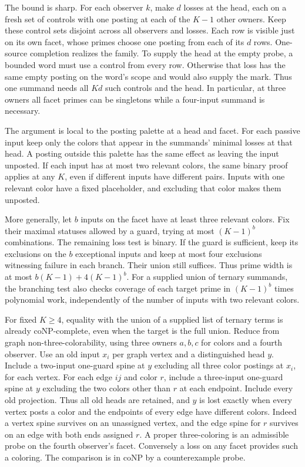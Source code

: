 The bound is sharp. For each observer $k$,
make $d$ losses at the head, each on a fresh
set of controls with one posting at each of the
$K-1$ other owners. Keep these control sets
disjoint across all observers and losses.
Each row is visible just on its own facet,
whose primes choose one posting from each of
its $d$ rows. One-source completion realizes
the family. To supply the head at the empty
probe, a bounded word must use a control
from every row. Otherwise that loss has the
same empty posting on the word's scope and
would also supply the mark. Thus one
summand needs all $Kd$ such controls and
the head. In particular, at three owners
all facet primes can be singletons while
a four-input summand is necessary.

The argument is local to the posting palette
at a head and facet. For each passive input
keep only the colors that appear in the
summands' minimal losses at that head.
A posting outside this palette has the same
effect as leaving the input unposted. If
each input has at most two relevant colors,
the same binary proof applies at any $K$,
even if different inputs have different
pairs. Inputs with one relevant color have
a fixed placeholder, and excluding that
color makes them unposted.

More generally, let $b$ inputs on the facet
have at least three relevant colors. Fix
their maximal statuses allowed by a guard,
trying at most $(K-1)^b$ combinations.
The remaining loss test is binary. If the
guard is sufficient, keep its exclusions
on the $b$ exceptional inputs and keep at
most four exclusions witnessing failure in
each branch. Their union still suffices.
Thus prime width is at most
$b(K-1)+4(K-1)^b$. For a supplied union
of ternary summands, the branching test
also checks coverage of each target prime
in $(K-1)^b$ times polynomial work,
independently of the number of inputs with
two relevant colors.

For fixed $K\geq4$, equality with the union of a supplied
list of ternary terms is already coNP-complete, even when
the target is the full union. Reduce from graph
non-three-colorability, using three owners $a,b,c$ for colors
and a fourth observer. Use an old input $x_i$ per graph
vertex and a distinguished head $y$. Include a two-input
one-guard spine at $y$ excluding all three color postings
at $x_i$, for each vertex. For each edge $ij$ and color $r$,
include a three-input one-guard spine at $y$ excluding the
two colors other than $r$ at each endpoint. Include every
old projection. Thus all old heads are retained, and $y$
is lost exactly when every vertex posts a color and the
endpoints of every edge have different colors. Indeed a
vertex spine survives on an unassigned vertex, and the
edge spine for $r$ survives on an edge with both ends
assigned $r$. A proper three-coloring is an admissible
probe on the fourth observer's facet. Conversely a loss
on any facet provides such a coloring. The comparison is
in coNP by a counterexample probe.

